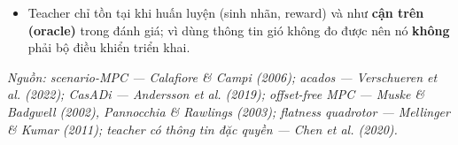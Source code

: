 \documentclass[11pt]{article}
\begin{document}
\begin{itemize}[leftmargin=1.4em,itemsep=1pt]
multiplier, bộ nhớ warm start của QP) rồi đặt nghiệm khởi tạo $x$ dọc tham chiếu, $\delta u=0$. Thực hiện ở
\textbf{đầu mỗi quỹ đạo}, \textbf{sau mỗi lần giải không dùng được} và \textbf{sau mỗi lần plant được đặt
lại do phân kỳ} (Mục 4.1). Lý do: một đối tượng solver được dùng cho nhiều chuyến (mỗi worker một solver
khi chạy song song; một solver suốt tiến trình ở các chế độ chạy tuần tự); nếu không đặt lại, multiplier hỏng từ một lần giải thất bại làm mọi lần giải sau đều
thất bại cho tới khi khởi động lại tiến trình. Cùng quy tắc bước này được dùng khi huấn luyện, trong các chế
độ chẩn đoán/so sánh và trong script đánh giá cuối.
\item Teacher chỉ tồn tại khi huấn luyện (sinh nhãn, reward) và như \textbf{cận trên (oracle)} trong đánh
giá; vì dùng thông tin gió không đo được nên nó \textbf{không} phải bộ điều khiển triển khai.
\end{itemize}
{\small\itshape Nguồn: scenario-MPC — Calafiore \& Campi (2006); acados — Verschueren et al. (2022);
CasADi — Andersson et al. (2019); offset-free MPC — Muske \& Badgwell (2002), Pannocchia \& Rawlings (2003);
flatness quadrotor — Mellinger \& Kumar (2011); teacher có thông tin đặc quyền — Chen et al. (2020).}
\end{document}
